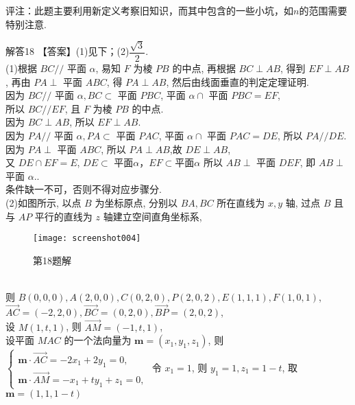 \documentclass[11pt]{article}
\begin{document}
\heiti 评注：\songti 此题主要利用新定义考察旧知识，而其中包含的一些小坑，如$n$的范围需要特别注意. 

\heiti 解答18 \songti 【答案】(1)见下；(2)$ \dfrac{\sqrt{3}}{2} $.
\\(1)\fangsong 根据 $B C / /$ 平面 $\alpha$, 易知 $F$ 为棱 $P B$ 的中点, 再根据 $B C \perp A B$, 得到 $E F \perp A B$,
再由 $P A \perp$ 平面 $A B C$, 得 $P A \perp A B$, 然后由线面垂直的判定定理证明.\\
\songti 因为 $B C / /$ 平面 $\alpha, B C \subset$ 平面 $P B C$, 平面 $\alpha \cap$ 平面 $P B C=E F$,
\\所以 $B C / / E F$, 且 $F$ 为棱 $P B$ 的中点.\\
因为 $B C \perp A B$, 所以 $E F \perp A B$.\\
因为 $P A / /$ 平面 $\alpha, P A \subset$ 平面 $P A C$, 平面 $\alpha \cap$ 平面 $P A C=D E$,
所以 $P A / / D E$.\\
因为 $P A \perp$ 平面 $A B C$,
所以 $P A \perp A B$,故 $D E \perp A B$, 
\\又 $D E \cap E F=E$, $DE \subset$ 平面$\alpha$，$EF \subset$平面$\alpha$
所以 $A B \perp$ 平面 $D E F$,
即 $A B \perp$ 平面 $\alpha .$.
\\ \kaishu 条件缺一不可，否则不得对应步骤分.
\\ \songti (2)如图所示, 以点 $B$ 为坐标原点, 分别以 $B A, B C$ 所在直线为 $x, y$ 轴, 过点 $B$ 且 与 $A P$ 平行的直线为 $z$ 轴建立空间直角坐标系,
\begin{figure}[htbp]
	\centering
	\texttt{[image: screenshot004]}
	\caption{\heiti 第18题解}
	\label{fig:screenshot004}
\end{figure}
\\则 $B(0,0,0), A(2,0,0), C(0,2,0), P(2,0,2), E(1,1,1), F(1,0,1)$,
$\overrightarrow{A C}=(-2,2,0), \overrightarrow{B C}=(0,2,0), \overrightarrow{B P}=(2,0,2)$, 
\\设 $M(1, t, 1)$,
则 $\overrightarrow{A M}=(-1, t, 1)$, 
\\设平面 $M A C$ 的一个法向量为 $\boldsymbol{m}=\left(x_{1}, y_{1}, z_{1}\right)$,
则 $\left\{\begin{array}{l}\boldsymbol{m} \cdot \overrightarrow{A C}=-2 x_{1}+2 y_{1}=0, \\ \boldsymbol{m} \cdot \overrightarrow{AM}=-x_{1}+t y_{1}+z_{1}=0,\end{array}\right.$ 令 $x_{1}=1$, 则 $y_{1}=1, z_{1}=1-t$,
取 $\boldsymbol{m}=\left(1, 1, 1-t\right)$ 
\end{document}
